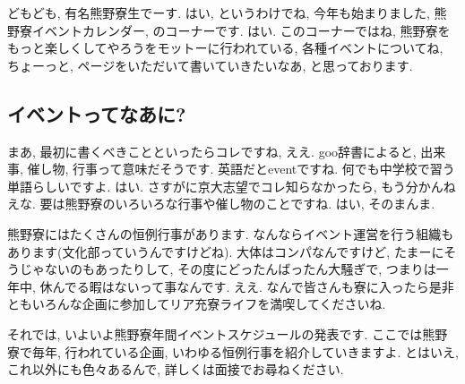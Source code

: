 \documentclass[10pt,b5jsbook,dvips,dvipdfmx,openany]{jsbook}
\theoremstyle{definition}
\begin{document}
 		どもども, 有名熊野寮生でーす. はい, というわけでね, 今年も始まりました, 熊野寮イベントカレンダー, のコーナーです. はい. このコーナーではね, 熊野寮をもっと楽しくしてやろうをモットーに行われている, 各種イベントについてね, ちょーっと, ページをいただいて書いていきたいなあ, と思っております. 

		\subsection{イベントってなあに? }

 		まあ, 最初に書くべきことといったらコレですね, ええ. goo辞書によると, 出来事, 催し物, 行事って意味だそうです. 英語だとeventですね. 何でも中学校で習う単語らしいですよ. はい. さすがに京大志望でコレ知らなかったら, もう分かんねえな. 要は熊野寮のいろいろな行事や催し物のことですね. はい, そのまんま. 
 
 		熊野寮にはたくさんの恒例行事があります. なんならイベント運営を行う組織もあります(文化部っていうんですけどね). 大体はコンパなんですけど, たまーにそうじゃないのもあったりして, その度にどったんばったん大騒ぎで, つまりは一年中, 休んでる暇はないって事なんです. ええ. なんで皆さんも寮に入ったら是非ともいろんな企画に参加してリア充寮ライフを満喫してくださいね. 
 		
		それでは, いよいよ熊野寮年間イベントスケジュールの発表です. ここでは熊野寮で毎年, 行われている企画, いわゆる恒例行事を紹介していきますよ. とはいえ, これ以外にも色々あるんで, 詳しくは面接でお尋ねください. 
\end{document}
